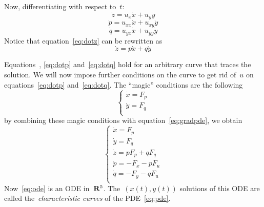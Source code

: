 Now, differentiating with respect to~$t$:
\begin{equation}\label{eq:dotz}
	\dot z=u_x\dot x + u_y\dot y
\end{equation}
\begin{equation}\label{eq:dotp}
	\dot p=u_{xx}\dot x + u_{xy}\dot y
\end{equation}
\begin{equation}\label{eq:dotq}
	\dot q=u_{yx}\dot x + u_{yy}\dot y
\end{equation}
Notice that equation~\ref{eq:dotz} can be rewritten as
\begin{equation}\label{eq:dotz2}\dot z=p\dot x+q\dot y\end{equation}

Equations~\label{eq:dotz2}, \ref{eq:dotp} and~\ref{eq:dotq} hold for an
arbitrary curve that traces the solution.  We will now impose further
conditions on the curve to get rid of~$u$ on equations~\ref{eq:dotp}
and~\ref{eq:dotq}.  The ``magic'' conditions are the following
\begin{equation}
	\begin{cases}
		\dot x = F_p \\
		\dot y = F_q \\
	\end{cases}
\end{equation}
by combining these magic conditions with equation~\ref{eq:gradpde}, we obtain
\begin{equation}\label{eq:ode}
	\begin{cases}
		\dot x = F_p \\
		\dot y = F_q \\
		\dot z = pF_p + qF_q \\
		\dot p = -F_x - pF_u \\
		\dot q = -F_y - qF_u \\
	\end{cases}
\end{equation}
Now~\ref{eq:ode} is an ODE in~$\mathbf{R}^5$.  The~$\left(x(t),y(t)\right)$ solutions
of this ODE are called the~\emph{characteristic curves} of the
PDE~\ref{eq:pde}.




